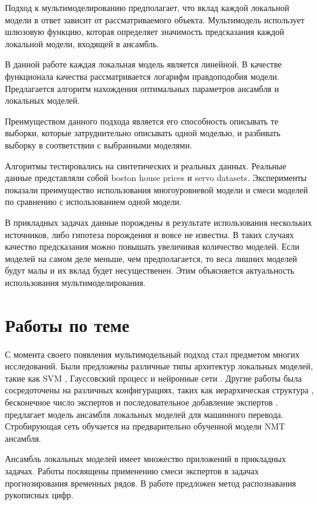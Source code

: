\documentclass[12pt, twoside]{article}
\begin{document}
Подход к мультимоделированию предполагает, что вклад каждой локальной модели в ответ зависит от рассматриваемого объекта. Мультимодель использует шлюзовую функцию, которая определяет значимость предсказания каждой локальной модели, входящей в ансамбль.

В данной работе каждая локальная модель является линейной. В качестве функционала качества рассматривается логарифм правдоподобия модели. Предлагается алгоритм нахождения оптимальных параметров ансамбля и локальных моделей. 

Преимуществом данного подхода является его способность описывать те выборки, которые затруднительно описывать одной моделью, и разбивать выборку в соответствии с выбранными моделями.

Алгоритмы тестировались на синтетических и реальных данных. Реальные данные представляли собой boston house prices и servo datasets. Эксперименты показали преимущество использования многоуровневой модели и смеси моделей по сравнению с использованием одной модели.


В прикладных задачах данные порождены в результате использования нескольких источников, либо гипотеза порождения и вовсе не известна. В таких случаях качество предсказания можно повышать увеличивая количество моделей. Если моделей на самом деле меньше, чем предполагается, то веса лишних моделей будут малы и их вклад
будет несущественен. Этим объясняется актуальность использования мультимоделирования.

\section{Работы по теме}

С момента своего появления мультимодельный подход стал предметом многих исследований. Были предложены различные типы архитектур локальных моделей, такие как SVM \cite{Collobert2002}, Гауссовский процесс \cite{Tresp01mixturesof}  и нейронные сети \cite{Shazeer2017}. Другие работы была сосредоточены на различных конфигурациях, таких как иерархическая структура \cite{NIPS1991_514}, бесконечное число экспертов \cite{Rasmussen} и последовательное добавление экспертов \cite{Aljundi2016}. \cite{garmash-monz-2016-ensemble} предлагает модель ансамбля локальных моделей для машинного перевода. Стробирующая сеть обучается на предварительно обученной модели NMT ансамбля. 

Ансамбль локальных моделей имеет множество приложений в прикладных задачах. Работы \cite{Yumlu2003, Cheung1995, Weigend2000} посвящены применению смеси экспертов в задачах прогнозирования временных
рядов. В работе \cite{article} предложен метод распознавания рукописных цифр.   
 


\end{document}
